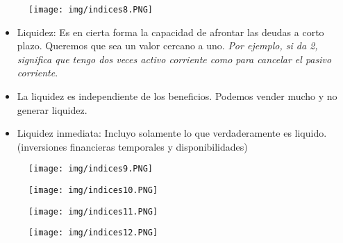\documentclass[titlepage,a4paper]{article}
\begin{document}
\begin{figure}[!htb]
    \centering
    \texttt{[image: img/indices8.PNG]}
\end{figure}
\begin{itemize}
\item Liquidez: Es en cierta forma la capacidad de afrontar las deudas a corto plazo. Queremos que sea un valor cercano a uno. \textit{Por ejemplo, si da 2, significa que tengo dos veces activo corriente como para cancelar el pasivo corriente}. 
\item La liquidez es independiente de los beneficios. Podemos vender mucho y no generar liquidez.
\item Liquidez inmediata: Incluyo solamente lo que verdaderamente es liquido. (inversiones financieras temporales y disponibilidades) 
\end{itemize}

\begin{figure}[!htb]
    \centering
    \texttt{[image: img/indices9.PNG]}
\end{figure}

\begin{figure}[!htb]
    \centering
    \texttt{[image: img/indices10.PNG]}
\end{figure}


\begin{figure}[!htb]
    \centering
    \texttt{[image: img/indices11.PNG]}
\end{figure}

\begin{figure}[!htb]
    \centering
    \texttt{[image: img/indices12.PNG]}
\end{figure}
\end{document}
